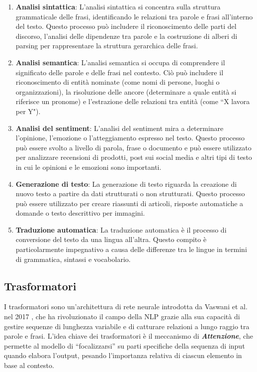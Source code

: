 \begin{enumerate}[label=\alph*.]
    \item \textbf{Analisi sintattica}: L'analisi sintattica si concentra sulla struttura grammaticale delle frasi, identificando le relazioni tra parole e frasi all'interno del testo. Questo processo può includere il riconoscimento delle parti del discorso, l'analisi delle dipendenze tra parole e la costruzione di alberi di parsing per rappresentare la struttura gerarchica delle frasi.

    \item \textbf{Analisi semantica}: L'analisi semantica si occupa di comprendere il significato delle parole e delle frasi nel contesto. Ciò può includere il riconoscimento di entità nominate (come nomi di persone, luoghi o organizzazioni), la risoluzione delle ancore (determinare a quale entità si riferisce un pronome) e l'estrazione delle relazioni tra entità (come ``X lavora per Y").
    
    \item \textbf{Analisi del sentiment}: L'analisi del sentiment mira a determinare l'opinione, l'emozione o l'atteggiamento espresso nel testo. Questo processo può essere svolto a livello di parola, frase o documento e può essere utilizzato per analizzare recensioni di prodotti, post sui social media e altri tipi di testo in cui le opinioni e le emozioni sono importanti.
    
    \item \textbf{Generazione di testo}: La generazione di testo riguarda la creazione di nuovo testo a partire da dati strutturati o non strutturati. Questo processo può essere utilizzato per creare riassunti di articoli, risposte automatiche a domande o testo descrittivo per immagini.
    
    \item \textbf{Traduzione automatica}: La traduzione automatica è il processo di conversione del testo da una lingua all'altra. Questo compito è particolarmente impegnativo a causa delle differenze tra le lingue in termini di grammatica, sintassi e vocabolario.

\end{enumerate}


\subsection{Trasformatori}\label{sec:transformers}
I trasformatori sono un'architettura di rete neurale introdotta da Vaswani et al. nel 2017 \cite{DBLP:conf/nips/VaswaniSPUJGKP17}, che ha rivoluzionato il campo della NLP grazie alla sua capacità di gestire sequenze di lunghezza variabile e di catturare relazioni a lungo raggio tra parole e frasi. L'idea chiave dei trasformatori è il meccanismo di \emph{\textbf{Attenzione}}, che permette al modello di ``focalizzarsi'' su parti specifiche della sequenza di input quando elabora l'output, pesando l'importanza relativa di ciascun elemento in base al contesto.

